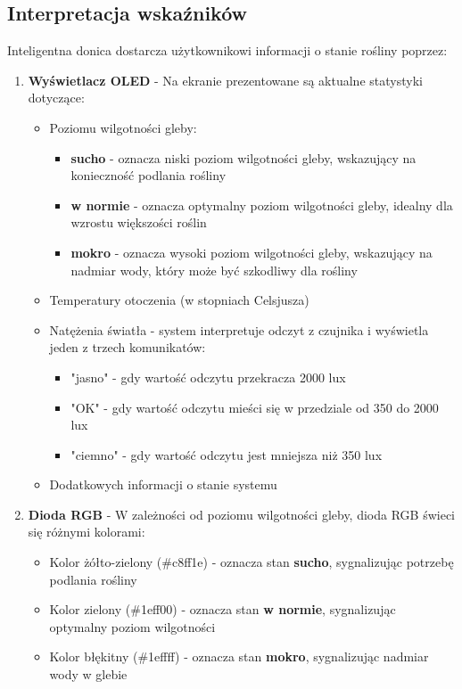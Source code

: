 \documentclass{article}
\begin{document}
\subsection{Interpretacja wskaźników}
Inteligentna donica dostarcza użytkownikowi informacji o stanie rośliny poprzez:
\begin{enumerate} 
     \item \textbf{Wyświetlacz OLED} - Na ekranie prezentowane są aktualne statystyki dotyczące: 
     \begin{itemize} 
         \item Poziomu wilgotności gleby:
             \begin{itemize}
                \label{sec:wykorzystanie_ADC}
                 \item \textbf{sucho} - oznacza niski poziom wilgotności gleby, wskazujący na konieczność podlania rośliny
                 \item \textbf{w normie} - oznacza optymalny poziom wilgotności gleby, idealny dla wzrostu większości roślin
                 \item \textbf{mokro} - oznacza wysoki poziom wilgotności gleby, wskazujący na nadmiar wody, który może być szkodliwy dla rośliny
             \end{itemize}
         \item Temperatury otoczenia (w stopniach Celsjusza) 
         \item Natężenia światła - system interpretuje odczyt z czujnika i wyświetla jeden z trzech komunikatów:
         \begin{itemize}
             \item "jasno" - gdy wartość odczytu przekracza 2000 lux
             \item "OK" - gdy wartość odczytu mieści się w przedziale od 350 do 2000 lux
             \item "ciemno" - gdy wartość odczytu jest mniejsza niż 350 lux
         \end{itemize}
         \item Dodatkowych informacji o stanie systemu 
     \end{itemize} 
     
     \item \textbf{Dioda RGB} - W zależności od poziomu wilgotności gleby, dioda RGB świeci się różnymi kolorami: 
     \begin{itemize} 
         \item Kolor żółto-zielony (\#c8ff1e) - oznacza stan \textbf{sucho}, sygnalizując potrzebę podlania rośliny
         \item Kolor zielony (\#1eff00) - oznacza stan \textbf{w normie}, sygnalizując optymalny poziom wilgotności
         \item Kolor błękitny (\#1effff) - oznacza stan \textbf{mokro}, sygnalizując nadmiar wody w glebie
     \end{itemize} 
 \end{enumerate}
\end{document}
